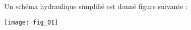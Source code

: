 \begin{multicols}{2}
%
%
Un schéma hydraulique simplifié est donné figure suivante :
\begin{center}
\texttt{[image: fig\_01]}
\end{center}
%
%
%
%
%

\end{multicols}

